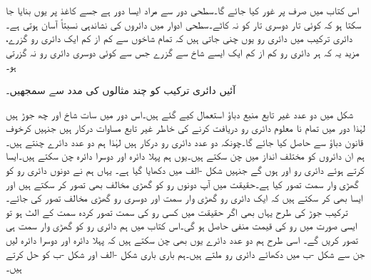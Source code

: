 اس کتاب میں صرف  پر غور کیا جائے گا۔سطحی دور سے مراد ایسا دور ہے جسے کاغذ پر یوں بنایا جا سکتا ہو کہ کوئی تار دوسری تار کو نہ کاٹے۔سطحی ادوار میں دائروں کی نشاندہی نسبتاً آسان ہوتی ہے۔دائری ترکیب میں دائری رو یوں چنی جاتی ہیں کہ تمام شاخوں سے کم از کم ایک دائری رو گزرے، مزید یہ کہ ہر دائری رو کم از کم ایک ایسے شاخ سے گزرے جس سے کوئی دوسری دائری رو نہ گزرتی ہو۔

آئیں دائری ترکیب کو چند مثالوں کی مدد سے سمجھیں۔

 شکل  میں دو عدد غیر تابع منبع دباؤ استعمال کیے گئے ہیں۔اس دور میں  سات شاخ اور چھ جوڑ ہیں لہٰذا دور میں تمام نا معلوم دائری رو دریافت کرنے کی خاطر  غیر تابع مساوات درکار ہیں جنہیں کرخوف قانون دباؤ سے حاصل کیا جائے گا۔چونکہ دو عدد دائری رو درکار ہیں لہٰذا ہم دو عدد دائرے چنتے ہیں۔ہم ان دائروں کو مختلف انداز میں چن سکتے ہیں۔یوں ہم پہلا دائرہ  اور دوسرا دائرہ  چن سکتے ہیں۔ایسا کرتے ہوئے دائری رو  اور  ہوں گے جنہیں  شکل -الف میں دکھایا گیا ہے۔ یہاں ہم نے دونوں دائری رو کو گھڑی وار سمت تصور کیا ہے۔حقیقت میں آپ دونوں رو کو گھڑی مخالف  بھی تصور کر سکتے ہیں اور ایسا بھی کر سکتے ہیں کہ ایک دائری رو گھڑی وار سمت اور دوسری رو گھڑی مخالف تصور کی جائے۔ترکیب جوڑ کی طرح یہاں بھی اگر حقیقت میں کسی رو کی سمت تصور کردہ سمت کے الٹ ہو تو ایسی صورت میں رو کی قیمت منفی حاصل ہو گی۔اس کتاب میں ہم دائری رو کو گھڑی وار سمت ہی تصور کریں گے۔ اسی طرح ہم دو عدد دائرے یوں بھی چن سکتے ہیں کہ پہلا دائرہ  اور دوسرا دائرہ  لیں جن سے شکل -ب میں دکھائے دائری رو ملتے ہیں۔ہم باری باری شکل -الف اور شکل -ب کو حل کرتے ہیں۔

